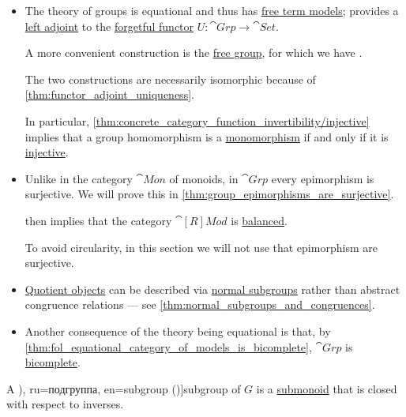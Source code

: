 \begin{definition}
\begin{thmenum}
\begin{itemize}
      \item The theory of groups is equational and thus has \hyperref[def:fol_free_term_model]{free term models};  provides a \hyperref[def:adjoint_functor]{left adjoint} to the \hyperref[def:fol_theory_forgetful_functor/set]{forgetful functor} \( U: \cat{Grp} \to \cat{Set} \).

      A more convenient construction is the \hyperref[def:free_group]{free group}, for which we have .

      The two constructions are necessarily isomorphic because of \cref{thm:functor_adjoint_uniqueness}.

      In particular, \cref{thm:concrete_category_function_invertibility/injective} implies that a group homomorphism is a \hyperref[def:morphism_cancellation/left]{monomorphism} if and only if it is \hyperref[def:function_invertibility/injective]{injective}.

      \item Unlike in the category \hyperref[def:monoid/category]{\( \cat{Mon} \)} of monoids, in \( \cat{Grp} \) every epimorphism is surjective. We will prove this in \cref{thm:group_epimorphisms_are_surjective}.

       then implies that the category \( \cat[R]{Mod} \) is \hyperref[def:balanced_category]{balanced}.

      To avoid circularity, in this section we will not use that epimorphism are surjective.

      \item \hyperref[def:categorical_quotient_object]{Quotient objects} can be described via \hyperref[def:normal_subgroup]{normal subgroups} rather than abstract congruence relations --- see \cref{thm:normal_subgroups_and_congruences}.

      \item Another consequence of the theory being equational is that, by \cref{thm:fol_equational_category_of_models_is_bicomplete}, \( \cat{Grp} \) is \hyperref[def:bicomplete_category]{bicomplete}.
    \end{itemize}

     A \term[bg=подгрупа (\cite[378]{Обрешков1962ВисшаАлгебра}), ru=подгруппа, en=subgroup (\cite[31]{Jacobson1985BasicAlgebraI})]{subgroup} of \( G \) is a \hyperref[def:monoid/subobject]{submonoid} that is closed with respect to inverses.


\end{thmenum}
\end{definition}
